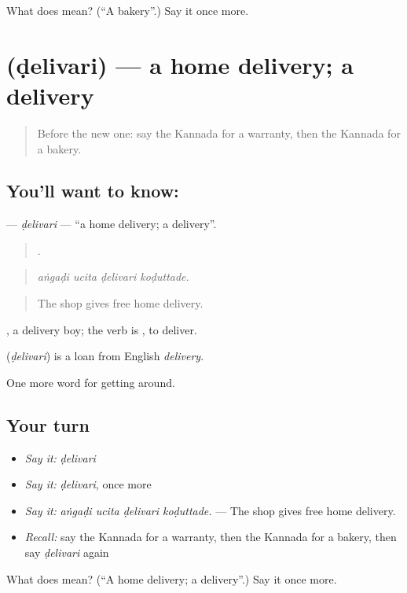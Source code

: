 \begin{tcolorbox}[breakable,colback=teal!4,colframe=teal!35!black,title={Before you move on}]
What does  mean? (\textquotedblleft{}A bakery\textquotedblright{}.) Say it once more.
\end{tcolorbox}
\section[\texorpdfstring{\kn{ಡೆಲಿವರಿ} (ḍelivari)}{ಡೆಲಿವರಿ (ḍelivari)}]{ (ḍelivari) — a home delivery; a delivery}

\label{lesson:KA-C469-delivari}



\begin{quote}
Before the new one: say the Kannada for a warranty, then the Kannada for a bakery.
\end{quote}

\subsection*{You'll want to know: }
\textbf{} — \emph{ḍelivari} — \textquotedblleft{}a home delivery; a delivery\textquotedblright{}.

\begin{quote}
   .
\end{quote}

\begin{quote}
\emph{aṅgaḍi ucita ḍelivari koḍuttade.}
\end{quote}

\begin{quote}
The shop gives free home delivery.
\end{quote}

 , a delivery boy; the verb is , to deliver.

\begin{cousinweb}
\textbf{} (\emph{ḍelivari}) is a loan from English \emph{delivery}.
\end{cousinweb}

\begin{grammarlens}[title={What you've built}]
One more word for getting around.
\end{grammarlens}

\subsection*{Your turn}
\begin{itemize}
\raggedright
  \item \emph{Say it:} \emph{ḍelivari}
  \item \emph{Say it:} \emph{ḍelivari}, once more
  \item \emph{Say it:} \emph{aṅgaḍi ucita ḍelivari koḍuttade.} — The shop gives free home delivery.
  \item \emph{Recall:} say the Kannada for a warranty, then the Kannada for a bakery, then say \emph{ḍelivari} again
\end{itemize}

\begin{tcolorbox}[breakable,colback=teal!4,colframe=teal!35!black,title={Before you move on}]
What does  mean? (\textquotedblleft{}A home delivery; a delivery\textquotedblright{}.) Say it once more.
\end{tcolorbox}

